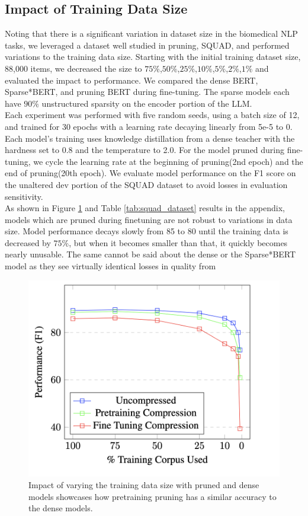 \subsection{Impact of Training Data Size}
Noting that there is a significant variation in dataset size in the biomedical NLP tasks, we leveraged a dataset well studied in pruning, SQUAD, and performed variations to the training data size. Starting with the initial training dataset size, 88,000 items, we decreased the size to $75\%$,$50\%$,$25\%$,$10\%$,$5\%$,$2\%$,$1\%$ and evaluated the impact to performance. We compared the dense BERT, Sparse*BERT, and pruning BERT during fine-tuning. The sparse models each have $90\%$ unstructured sparsity on the encoder portion of the LLM. \\ 
Each experiment was performed with five random seeds, using a batch size of 12, and trained for 30 epochs with a learning rate decaying linearly from 5e-5 to 0. Each model's training uses knowledge distillation from a dense teacher with the hardness set to 0.8 and the temperature to 2.0. For the model pruned during fine-tuning, we cycle the learning rate at the beginning of pruning(2nd epoch) and the end of pruning(20th epoch). We evaluate model performance on the F1 score on the unaltered dev portion of the SQUAD dataset to avoid losses in evaluation sensitivity.\\
As shown in Figure \ref{fig:squad_data_size} and Table \ref{tab:squad_dataset} results in the appendix, models which are pruned during finetuning are not robust to variations in data size. Model performance decays slowly from 85 to 80 until the training data is decreased by $75\%$, but when it becomes smaller than that, it quickly becomes nearly unusable. The same cannot be said about the dense or the Sparse*BERT model as they see virtually identical losses in quality from 
\begin{figure}
   \centering
    \includegraphics[scale=0.5
    ]{media-sparse/sparseBIO-figure2.png}
    \vspace{-1.2em}

\caption{Impact of varying the training data size with pruned and dense models showcases how pretraining pruning has a similar accuracy to the dense models.}
\label{fig:squad_data_size}
\end{figure}
